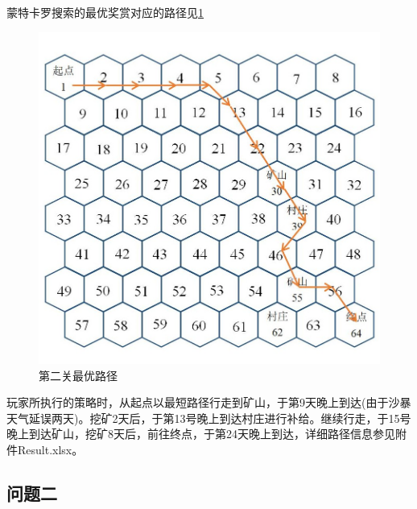 \documentclass[withoutpre]{cumcmthesis} %
\begin{document}
蒙特卡罗搜索的最优奖赏对应的路径见\cref{fig:map2path}
\begin{figure}[H]
	\centering
	\includegraphics[scale=0.5]{figures/map2path.jpg}
	\caption{第二关最优路径}
	\label{fig:map2path}
\end{figure}

玩家所执行的策略时，从起点以最短路径行走到矿山，于第9天晚上到达(由于沙暴天气延误两天)。挖矿2天后，于第13号晚上到达村庄进行补给。继续行走，于15号晚上到达矿山，挖矿8天后，前往终点，于第24天晚上到达，详细路径信息参见附件Result.xlsx。



\subsection{问题二}
\end{document}
